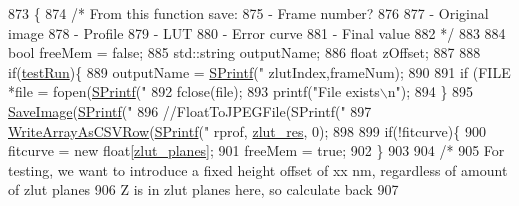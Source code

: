 \begin{DoxyCode}
873 \{
874     \textcolor{comment}{/* From this function save:}
875 \textcolor{comment}{        - Frame number?}
876 \textcolor{comment}{        }
877 \textcolor{comment}{        - Original image}
878 \textcolor{comment}{        - Profile}
879 \textcolor{comment}{        - LUT}
880 \textcolor{comment}{        - Error curve}
881 \textcolor{comment}{        - Final value}
882 \textcolor{comment}{    */}
883 
884     \textcolor{keywordtype}{bool} freeMem = \textcolor{keyword}{false};
885     std::string outputName;
886     \textcolor{keywordtype}{float} zOffset;
887 
888     \textcolor{keywordflow}{if}(\hyperlink{class_c_p_u_tracker_a5dd04ccf64ee6885b2dc272553c29644}{testRun})\{
889         outputName = \hyperlink{utils_8cpp_aba26a6b64035ef7962a63b760dd9013e}{SPrintf}(\textcolor{stringliteral}{"%
      zlutIndex,frameNum);
890         
891         \textcolor{keywordflow}{if} (FILE *file = fopen(\hyperlink{utils_8cpp_aba26a6b64035ef7962a63b760dd9013e}{SPrintf}(\textcolor{stringliteral}{"%
892             fclose(file);
893             printf(\textcolor{stringliteral}{"File exists\(\backslash\)n"});
894         \}
895         \hyperlink{class_c_p_u_tracker_ad43acbdbc335850b8b01a5c6508ef902}{SaveImage}(\hyperlink{utils_8cpp_aba26a6b64035ef7962a63b760dd9013e}{SPrintf}(\textcolor{stringliteral}{"%
896         \textcolor{comment}{//FloatToJPEGFile(SPrintf("%
897         \hyperlink{utils_8cpp_aa0fb8da4922e3042928ed9f6388bc09a}{WriteArrayAsCSVRow}(\hyperlink{utils_8cpp_aba26a6b64035ef7962a63b760dd9013e}{SPrintf}(\textcolor{stringliteral}{"%
      rprof, \hyperlink{class_c_p_u_tracker_a058eae282c9bf847cd8e39664688c5bc}{zlut\_res}, 0);
898 
899         \textcolor{keywordflow}{if}(!fitcurve)\{
900             fitcurve = \textcolor{keyword}{new} \textcolor{keywordtype}{float}[\hyperlink{class_c_p_u_tracker_ad28d60ad587ae3f89b9dba7f82c135f7}{zlut\_planes}];
901             freeMem = \textcolor{keyword}{true};
902         \}
903 
904         \textcolor{comment}{/* }
905 \textcolor{comment}{            For testing, we want to introduce a fixed height offset of xx nm, regardless of amount of zlut
       planes}
906 \textcolor{comment}{            Z is in zlut planes here, so calculate back}
907 \textcolor{comment}{}
}}}}}
\end{DoxyCode}
